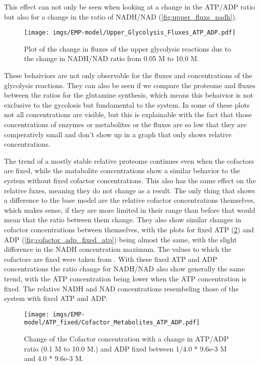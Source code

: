 This effect can not only be seen when looking at a change in the ATP/ADP ratio but also for a change in the ratio of NADH/NAD (\ref{fig:upper_fluxs_nadh}).
\begin{figure}[H]
    \centering
    \texttt{[image: imgs/EMP-model/Upper\_Glycolysis\_Fluxes\_ATP\_ADP.pdf]}
    \caption{Plot of the change in fluxes of the upper glycolysis reactions due to the change in NADH/NAD ratio from 0.05 M to 10.0 M.}
    \label{fig:upper_fluxes_nadh}
\end{figure}

These behaiviors are not only observable for the fluxes and concentrations of the glycolysis reactions. They can also be seen if we compare the proteome and fluxes between the ratios for the glutamine synthesis, which means this behaivior is not exclusive to the gycolosis but fundamental to the system.
In some of these plots not all concentrations are visible, but this is explainable with the fact that those concentrations of enzymes or metabolites or the fluxes are so low that they are comperativly small and don't show up in a graph that only shows relative concentrations.

The trend of a mostly stable relative proteome continues even when the cofactors are fixed, while the matabolite concentrations show a similar behavior to the system without fixed cofactor concentrations. This also has the same effect on the relative fuxes, meaning they do not change as a result. The only thing that shows a difference to the base model are the relative cofactor concentrations themselves, which makes sense, if they are more limited in their range than before that would mean that the ratio between them change. They also show similar changes in cofactor concentrations between themselves, with the plots for fixed ATP (\ref{fig:cofactor_atp_fixed_atp}) and ADP (\ref{fig:cofactor_adp_fixed_atp}) being almost the same, with the slight difference in the NADH concentration maximum. 
The values to which the cofactors are fixed were taken from \cite{bennett2009absolute}. With these fixed ATP and ADP concentrations the ratio change for NADH/NAD also show generally the same trend, with the ATP concentration being lower when the ATP concentration is fixed. The relative NADH and NAD concentrations resembeling those of the system with fixed ATP and ADP.
\begin{figure}[H]
    \centering
    \texttt{[image: imgs/EMP-model/ATP\_fixed/Cofactor\_Metabolites\_ATP\_ADP.pdf]}
    \caption{Change of the Cofactor concentration with a change in ATP/ADP ratio (0.1 M to 10.0 M.) and ADP fixed between 1/4.0 * 9.6e-3 M and 4.0 * 9.6e-3 M.}
    \label{fig:cofactor_atp_fixed_atp}
\end{figure}

